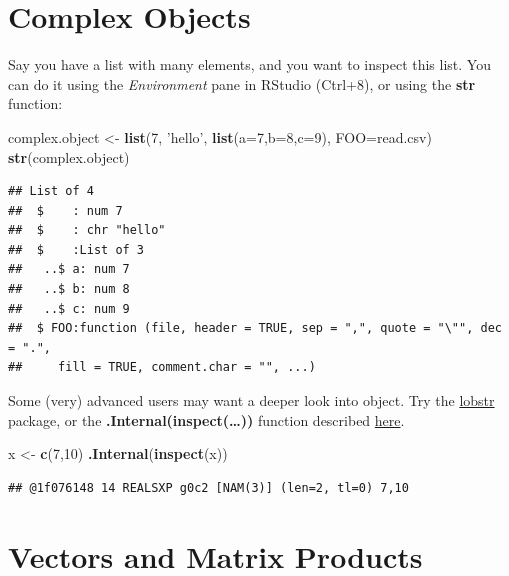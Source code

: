 \documentclass[]{book}
\newenvironment{Shaded}{\begin{snugshade}}{\end{snugshade}}
\newcommand{\KeywordTok}[1]{\textcolor[rgb]{0.13,0.29,0.53}{\textbf{#1}}}
\newcommand{\DataTypeTok}[1]{\textcolor[rgb]{0.13,0.29,0.53}{#1}}
\newcommand{\DecValTok}[1]{\textcolor[rgb]{0.00,0.00,0.81}{#1}}
\newcommand{\StringTok}[1]{\textcolor[rgb]{0.31,0.60,0.02}{#1}}
\newcommand{\NormalTok}[1]{#1}
\theoremstyle{definition}
\theoremstyle{definition}
\theoremstyle{definition}
\theoremstyle{remark}
\begin{document}
\section{Complex Objects}\label{complex-objects}

Say you have a list with many elements, and you want to inspect this
list. You can do it using the \emph{Environment} pane in RStudio
(Ctrl+8), or using the \textbf{str} function:

\begin{Shaded}
\begin{Highlighting}[]
\NormalTok{complex.object <-}\StringTok{ }\KeywordTok{list}\NormalTok{(}\DecValTok{7}\NormalTok{, }\StringTok{'hello'}\NormalTok{, }\KeywordTok{list}\NormalTok{(}\DataTypeTok{a=}\DecValTok{7}\NormalTok{,}\DataTypeTok{b=}\DecValTok{8}\NormalTok{,}\DataTypeTok{c=}\DecValTok{9}\NormalTok{), }\DataTypeTok{FOO=}\NormalTok{read.csv)}
\KeywordTok{str}\NormalTok{(complex.object)}
\end{Highlighting}
\end{Shaded}

\begin{verbatim}
## List of 4
##  $    : num 7
##  $    : chr "hello"
##  $    :List of 3
##   ..$ a: num 7
##   ..$ b: num 8
##   ..$ c: num 9
##  $ FOO:function (file, header = TRUE, sep = ",", quote = "\"", dec = ".", 
##     fill = TRUE, comment.char = "", ...)
\end{verbatim}

Some (very) advanced users may want a deeper look into object. Try the
\href{https://github.com/r-lib/lobstr/blob/master/README.md}{lobstr}
package, or the \textbf{.Internal(inspect(\ldots{}))} function described
\href{https://www.brodieg.com/2019/02/18/an-unofficial-reference-for-internal-inspect/}{here}.

\begin{Shaded}
\begin{Highlighting}[]
\NormalTok{x <-}\StringTok{ }\KeywordTok{c}\NormalTok{(}\DecValTok{7}\NormalTok{,}\DecValTok{10}\NormalTok{)}
\KeywordTok{.Internal}\NormalTok{(}\KeywordTok{inspect}\NormalTok{(x))}
\end{Highlighting}
\end{Shaded}

\begin{verbatim}
## @1f076148 14 REALSXP g0c2 [NAM(3)] (len=2, tl=0) 7,10
\end{verbatim}

\section{Vectors and Matrix Products}\label{vectors-and-matrix-products}
\end{document}
